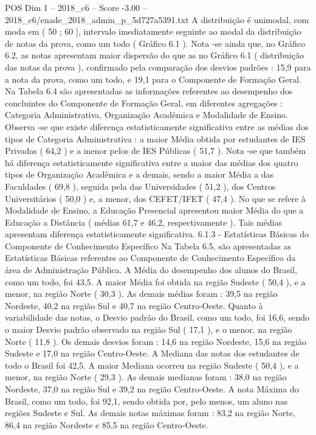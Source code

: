 \begin{textsample}{POS Dim 1 – 2018\_c6 – Score -3.00 – 2018\_c6/enade\_2018\_admin\_p\_5d727a5391.txt}
A distribuição é unimodal, com moda em ( 50 ; 60 ], intervalo imediatamente seguinte ao modal da distribuição de notas da prova, como um todo ( Gráfico 6.1 ).
Nota -se ainda que, no Gráfico 6.2, as notas apresentam maior dispersão do que as no Gráfico 6.1 ( distribuição das notas da prova ), confirmado pela comparação dos desvios padrões : 15,9 para a nota da prova, como um todo, e 19,1 para o Componente de Formação Geral.
Na Tabela 6.4 são apresentadas as informações referentes ao desempenho dos concluintes do Componente de Formação Geral, em diferentes agregações : Categoria Administrativa, Organização Acadêmica e Modalidade de Ensino.
Observa -se que existe diferença estatisticamente significativa entre as médias dos tipos de Categoria Administrativa : a maior Média obtida por estudantes de IES Privadas ( 64,2 ) e a menor pelos de IES Públicas ( 51,7 ).
Nota -se que também há diferença estatisticamente significativa entre a maior das médias dos quatro tipos de Organização Acadêmica e a demais, sendo a maior Média a das Faculdades ( 69,8 ), seguida pela das Universidades ( 51,2 ), dos Centros Universitários ( 50,0 ) e, a menor, dos CEFET/IFET ( 47,4 ).
No que se refere à Modalidade de Ensino, a Educação Presencial apresentou maior Média do que a Educação a Distância ( médias 61,7 e 46,2, respectivamente ).
Tais médias apresentam diferença estatisticamente significativa. 6.1.3 - Estatísticas Básicas do Componente de Conhecimento Específico Na Tabela 6.5, são apresentadas as Estatísticas Básicas referentes ao Componente de Conhecimento Específico da área de Administração Pública.
A Média do desempenho dos alunos do Brasil, como um todo, foi 43,5.
A maior Média foi obtida na região Sudeste ( 50,4 ), e a menor, na região Norte ( 30,3 ).
As demais médias foram : 39,5 na região Nordeste, 40,2 na região Sul e 40,7 na região Centro-Oeste.
Quanto à variabilidade das notas, o Desvio padrão do Brasil, como um todo, foi 16,6, sendo o maior Desvio padrão observado na região Sul ( 17,1 ), e o menor, na região Norte ( 11,8 ).
Os demais desvios foram : 14,6 na região Nordeste, 15,6 na região Sudeste e 17,0 na região Centro-Oeste.
A Mediana das notas dos estudantes de todo o Brasil foi 42,5.
A maior Mediana ocorreu na região Sudeste ( 50,4 ), e a menor, na região Norte ( 29,3 ).
As demais medianas foram : 38,0 na região Nordeste, 37,0 na região Sul e 39,2 na região Centro-Oeste.
A nota Máxima do Brasil, como um todo, foi 92,1, sendo obtida por, pelo menos, um aluno nas regiões Sudeste e Sul.
As demais notas máximas foram : 83,2 na região Norte, 86,4 na região Nordeste e 85,5 na região Centro-Oeste.

\end{textsample}
